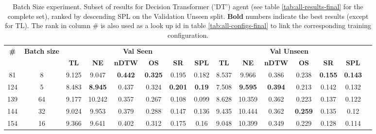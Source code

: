 \begin{table}
\centering
\caption{\label{tab:dt_batch_test}Batch Size experiment. Subset of results for Decision Transformer ('DT') agent (see table \ref{tab:all-results-final} for the complete set), ranked by descending SPL on the Validation Unseen split. \textbf{Bold} numbers indicate the best results (except for TL). The rank in column \# is also used as a look up id in table \ref{tab:all-configs-final} to link the corresponding training configuration.}
\begin{tabular}{@{\hskip3pt}c@{\hskip3pt}c@{\hskip3pt}c@{\hskip3pt}c@{\hskip3pt}c@{\hskip3pt}c@{\hskip3pt}c@{\hskip3pt}c@{\hskip3pt}c@{\hskip3pt}c@{\hskip3pt}c@{\hskip3pt}c@{\hskip3pt}c@{\hskip3pt}c@{\hskip3pt}c}
\toprule
                                  \textbf{\#} & \textbf{Batch size} & \multicolumn{6}{c}{\textbf{Val Seen}} & \multicolumn{6}{c}{\textbf{Val Unseen}} \\
\cmidrule(l){3-8}\cmidrule(l){9-14}\textbf{~} &          \textbf{~} &       \textbf{TL} &     \textbf{NE} &   \textbf{nDTW} &     \textbf{OS} &     \textbf{SR} &   \textbf{SPL} &         \textbf{TL} &     \textbf{NE} &   \textbf{nDTW} &     \textbf{OS} &     \textbf{SR} &    \textbf{SPL} \\
\midrule
                                           81 &                   8 &             9.125 &           9.047 &  \textbf{0.442} &  \textbf{0.325} &           0.195 &          0.182 &               8.537 &           9.966 &           0.386 &           0.238 &  \textbf{0.155} &  \textbf{0.143} \\
                                          124 &                   5 &             8.483 &  \textbf{8.945} &           0.437 &           0.324 &  \textbf{0.201} &  \textbf{0.19} &               7.508 &  \textbf{9.595} &  \textbf{0.394} &           0.213 &           0.142 &           0.132 \\
                                          139 &                  64 &             9.177 &          10.242 &           0.357 &           0.267 &           0.108 &          0.099 &               8.628 &          10.359 &           0.362 &           0.223 &           0.137 &           0.122 \\
                                          144 &                  32 &             9.024 &           9.953 &           0.379 &           0.288 &           0.147 &          0.136 &               9.435 &          10.444 &           0.362 &  \textbf{0.259} &           0.135 &            0.12 \\
                                          154 &                  16 &             9.366 &           9.641 &           0.402 &           0.312 &           0.175 &           0.16 &               9.048 &          10.399 &           0.349 &           0.229 &           0.128 &           0.114 \\
\bottomrule
\end{tabular}
\end{table}
